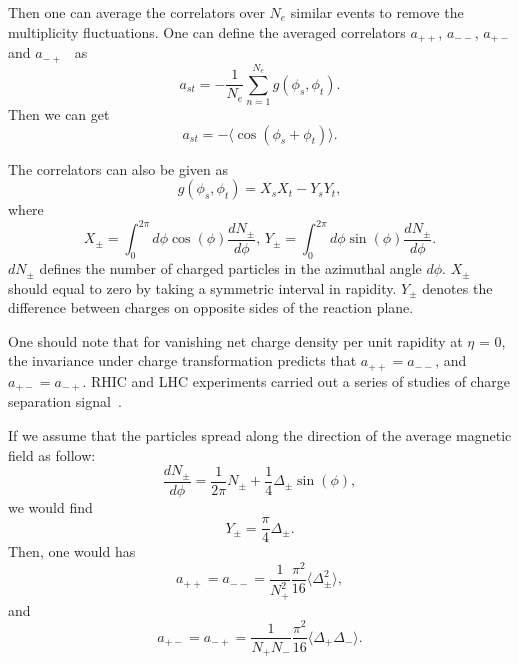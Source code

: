\documentclass[twocolumn,showpacs,preprintnumbers,amsmath,amssymb]{revtex4}
\begin{document}
Then one can average the correlators over $N_{e}$ similar events to remove the multiplicity fluctuations. One can define the averaged
correlators $a_{++}$, $a_{--}$, $a_{+-}$ and $a_{-+}$~\cite{lab7,lab29} as
\begin{equation}
a_{st}=-\frac{1}{N_{e}}\sum_{n=1}^{N_{e}}g(\phi_{s},\phi_{t}).
\label{eq:eq25} %
\end{equation}
Then we can get
\begin{equation}
a_{st} = - \langle \cos(\phi_s + \phi_t) \rangle.
\end{equation}

The correlators can also be given as
\begin{equation}
g(\phi_s, \phi_t) = X_s X_t - Y_s Y_t, 
\end{equation}
where
\begin{equation}
X_{\pm} = \int_0^{2\pi} d \phi \cos(\phi) \frac{d N_\pm}{d \phi}, \, Y_{\pm} = \int_0^{2\pi} d \phi \sin(\phi) \frac{d N_{\pm}}{d \phi}.
\end{equation}
$d N_\pm$ defines the number of charged particles in the azimuthal angle $d\phi$. $X_\pm$ should equal to zero by taking a symmetric interval in rapidity. $Y_\pm$ denotes the difference between charges on opposite sides of the reaction plane.

One should note that for vanishing net charge density per unit rapidity at $\eta$ = 0, the invariance under charge transformation predicts that
$a_{++}=a_{--}$, and $a_{+-}=a_{-+}$. RHIC and LHC experiments carried out a series of studies of charge separation signal~\cite{lab8,lab9,lab10,lab11}.

If we assume that the particles  spread along the direction of the average magnetic field as follow:
\begin{equation}
\frac{dN_{\pm}}{d \phi} = \frac{1}{2\pi} N_{\pm} + \frac{1}{4} \Delta_{\pm} \sin(\phi),
\end{equation}
we would find
\begin{equation}
Y_{\pm} = \frac{\pi}{4} \Delta_{\pm}.
\end{equation}
Then, one would has
\begin{equation}
a_{++}=a_{--}=\frac{1}{N_{+}^{2}} \frac{\pi^2}{16} \langle\Delta_{\pm}^{2}\rangle,
\label{eq:eq28} %
\end{equation}
and
\begin{equation}
a_{+-}=a_{-+}=\frac{1}{N_{+}N_{-}} \frac{\pi^2}{16} \langle\Delta_{+}\Delta_{-}\rangle.
\label{eq:eq29} %
\end{equation}
\end{document}
